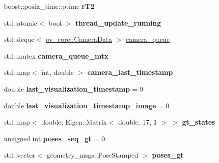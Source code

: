 \begin{DoxyCompactItemize}
boost\+::posix\+\_\+time\+::ptime {\bfseries r\+T2}
\item 
\mbox{\label{classov__msckf_1_1ROS1Visualizer_aa73986823a3522bd240d080d67a675c9}} 
std\+::atomic$<$ bool $>$ {\bfseries thread\+\_\+update\+\_\+running}
\item 
std\+::deque$<$ \hyperlink{structov__core_1_1CameraData}{ov\+\_\+core\+::\+Camera\+Data} $>$ \hyperlink{classov__msckf_1_1ROS1Visualizer_a96e92f8bf544cc689e3fd203d3340e97}{camera\+\_\+queue}
\item 
\mbox{\label{classov__msckf_1_1ROS1Visualizer_a3bd226c3221277a8944d50180aa67fc5}} 
std\+::mutex {\bfseries camera\+\_\+queue\+\_\+mtx}
\item 
\mbox{\label{classov__msckf_1_1ROS1Visualizer_ac749d103cb9e6143732ad98354026091}} 
std\+::map$<$ int, double $>$ {\bfseries camera\+\_\+last\+\_\+timestamp}
\item 
\mbox{\label{classov__msckf_1_1ROS1Visualizer_a3e96971588802b6a285be451b8ef4be4}} 
double {\bfseries last\+\_\+visualization\+\_\+timestamp} = 0
\item 
\mbox{\label{classov__msckf_1_1ROS1Visualizer_a1d432f8be305f334af61509816715fbf}} 
double {\bfseries last\+\_\+visualization\+\_\+timestamp\+\_\+image} = 0
\item 
\mbox{\label{classov__msckf_1_1ROS1Visualizer_a2f6fc9f0be8b52bdceeab9244244bc97}} 
std\+::map$<$ double, Eigen\+::\+Matrix$<$ double, 17, 1 $>$ $>$ {\bfseries gt\+\_\+states}
\item 
\mbox{\label{classov__msckf_1_1ROS1Visualizer_a581a9fe50f2041f348614834b98ce6fb}} 
unsigned int {\bfseries poses\+\_\+seq\+\_\+gt} = 0
\item 
\mbox{\label{classov__msckf_1_1ROS1Visualizer_ab0d14251833cba5ac33afc0236f0ee85}} 
std\+::vector$<$ geometry\+\_\+msgs\+::\+Pose\+Stamped $>$ {\bfseries poses\+\_\+gt}
\item 
\mbox{\label{classov__msckf_1_1ROS1Visualizer_aeeb66a8c0990cd4e91fc2346ec16bdf3}} 

\end{DoxyCompactItemize}
